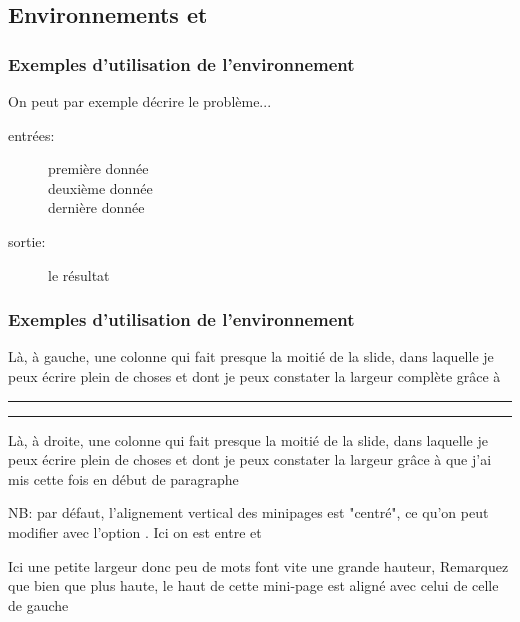 \subsection{Environnements  et }
\begin{frame}
  \frametitle{Exemples d'utilisation de l'environnement }
  On peut par exemple décrire le problème...
  \begin{description}
    \item[entrées:] première donnée\\
    deuxième donnée\\
    dernière donnée\\
    \item[sortie:] le résultat
  \end{description}
\end{frame}

\begin{frame}
  \frametitle{Exemples d'utilisation de l'environnement }
  
  \begin{minipage}{0.48\textwidth}
    Là, à gauche, une colonne qui fait presque la moitié de la slide, dans laquelle je peux écrire plein de choses et dont je peux constater la largeur complète grâce à 
    \lin{\hrule} \hrule
  \end{minipage}
  \hspace*{0.2cm}
  \begin{minipage}{0.48\textwidth}
    \hrule
    Là, à droite, une colonne qui fait presque la moitié de la slide, dans laquelle je peux écrire plein de choses et dont je peux constater la largeur grâce à \lin{\hrule}
    que j'ai mis cette fois en début de paragraphe
  \end{minipage}

  \vspace*{0.4cm}

  \begin{minipage}[t]{0.64\textwidth}
    NB: par défaut, l'alignement vertical des minipages est "centré", ce qu'on peut modifier avec l'option \lin{[t]}. 
    Ici on est entre 
    et \lin{\end{minipage}}
  \end{minipage}
  \hspace*{0.2cm}
  \begin{minipage}[t]{0.32\textwidth}
    Ici une petite largeur donc peu de mots font vite une grande hauteur,
    Remarquez que bien que plus haute, le haut de cette mini-page est aligné avec celui de celle de gauche
  \end{minipage}
\end{frame}

